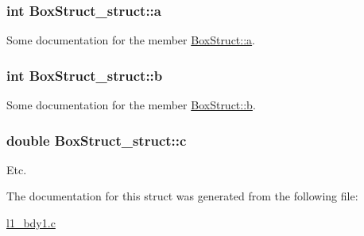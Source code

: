 \subsubsection[{\texorpdfstring{a}{a}}]{\setlength{\rightskip}{0pt plus 5cm}int Box\+Struct\+\_\+struct\+::a}\hypertarget{structBoxStruct__struct_a4593938c5e90f024e7971bdb1392d9d6}{}\label{structBoxStruct__struct_a4593938c5e90f024e7971bdb1392d9d6}


Some documentation for the member \hyperlink{structBoxStruct__struct_a4593938c5e90f024e7971bdb1392d9d6}{Box\+Struct\+::a}. 

\subsubsection[{\texorpdfstring{b}{b}}]{\setlength{\rightskip}{0pt plus 5cm}int Box\+Struct\+\_\+struct\+::b}\hypertarget{structBoxStruct__struct_aee44748dc579c5d794853ee8b133d197}{}\label{structBoxStruct__struct_aee44748dc579c5d794853ee8b133d197}


Some documentation for the member \hyperlink{structBoxStruct__struct_aee44748dc579c5d794853ee8b133d197}{Box\+Struct\+::b}. 

\subsubsection[{\texorpdfstring{c}{c}}]{\setlength{\rightskip}{0pt plus 5cm}double Box\+Struct\+\_\+struct\+::c}\hypertarget{structBoxStruct__struct_a4543370ed67b2cf5ae3f55201bea11e6}{}\label{structBoxStruct__struct_a4543370ed67b2cf5ae3f55201bea11e6}


Etc. 



The documentation for this struct was generated from the following file\+:\begin{DoxyCompactItemize}
\item 
\hyperlink{l1__bdy1_8c}{l1\+\_\+bdy1.\+c}\end{DoxyCompactItemize}
